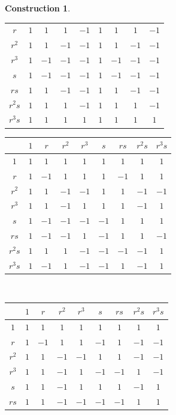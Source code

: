 \documentclass{article}
\theoremstyle{plain}
\theoremstyle{definition}
\newtheorem{const}[thm]{Construction}
\begin{document}
\begin{const}
\begin{table}[H]
\begin{tabular}{ c | c   c   c   c   c   c   c   c}
$r$ & $1$ & $1$ & $1$ & $-1$ & $1$ & $1$ & $1$ & $-1$ \\
$r^2$ & $1$ & $1$ & $-1$ & $-1$ & $1$ & $1$ & $-1$ & $-1$ \\
$r^3$ & $1$ & $-1$ & $-1$ & $-1$ & $1$ & $-1$ & $-1$ & $-1$ \\
$s$ & $1$ & $-1$ & $-1$ & $-1$ & $1$ & $-1$ & $-1$ & $-1$ \\
$rs$ & $1$ & $1$ & $-1$ & $-1$ & $1$ & $1$ & $-1$ & $-1$ \\
$r^2s$ & $1$ & $1$ & $1$ & $-1$ & $1$ & $1$ & $1$ & $-1$ \\
$r^3s$ & $1$ & $1$ & $1$ & $1$ & $1$ & $1$ & $1$ & $1$
\end{tabular}
\end{table}
\begin{table}[H]
\centering
\begin{tabular}{ c | c   c   c   c   c   c   c   c}
& $1$ & $r$ & $r^2$ & $r^3$ & $s$ & $rs$ & $r^2s$ & $r^3s$ \\
\hline
$1$ & $1$ & $1$ & $1$ & $1$ & $1$ & $1$ & $1$ & $1$ \\
$r$ & $1$ & $-1$ & $1$ & $1$ & $1$ & $-1$ & $1$ & $1$ \\
$r^2$ & $1$ & $1$ & $-1$ & $-1$ & $1$ & $1$ & $-1$ & $-1$ \\
$r^3$ & $1$ & $1$ & $-1$ & $1$ & $1$ & $1$ & $-1$ & $1$ \\
$s$ & $1$ & $-1$ & $-1$ & $-1$ & $-1$ & $1$ & $1$ & $1$ \\
$rs$ & $1$ & $-1$ & $-1$ & $1$ & $-1$ & $1$ & $1$ & $-1$ \\
$r^2s$ & $1$ & $1$ & $1$ & $-1$ & $-1$ & $-1$ & $-1$ & $1$ \\
$r^3s$ & $1$ & $-1$ & $1$ & $-1$ & $-1$ & $1$ & $-1$ & $1$
\end{tabular} ~~~
\begin{tabular}{ c | c   c   c   c   c   c   c   c}
& $1$ & $r$ & $r^2$ & $r^3$ & $s$ & $rs$ & $r^2s$ & $r^3s$ \\
\hline
$1$ & $1$ & $1$ & $1$ & $1$ & $1$ & $1$ & $1$ & $1$ \\
$r$ & $1$ & $-1$ & $1$ & $1$ & $-1$ & $1$ & $-1$ & $-1$ \\
$r^2$ & $1$ & $1$ & $-1$ & $-1$ & $1$ & $1$ & $-1$ & $-1$ \\
$r^3$ & $1$ & $1$ & $-1$ & $1$ & $-1$ & $-1$ & $1$ & $-1$ \\
$s$ & $1$ & $1$ & $-1$ & $1$ & $1$ & $1$ & $-1$ & $1$ \\
$rs$ & $1$ & $1$ & $-1$ & $-1$ & $-1$ & $-1$ & $1$ & $1$ \\

\end{tabular}
\end{table}
\end{const}
\end{document}

